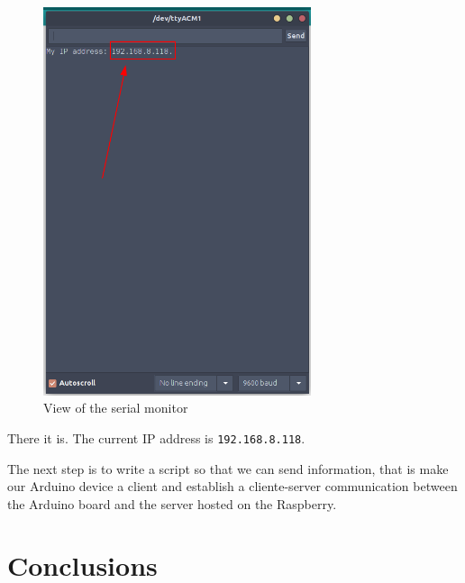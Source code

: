 \begin{figure}[H]
    \centering
    \includegraphics[width=0.7\textwidth]{fig/serial-monitor-ip.png}
    \caption{View of the serial monitor}
    \label{fig:serial-monitor-ip}
\end{figure}

There it is. The current IP address is \verb|192.168.8.118|.

The next step is to write a script so that we can send information, that is make our Arduino device a client and establish a cliente-server communication between the Arduino board and the server hosted on the Raspberry.



\section{Conclusions}



